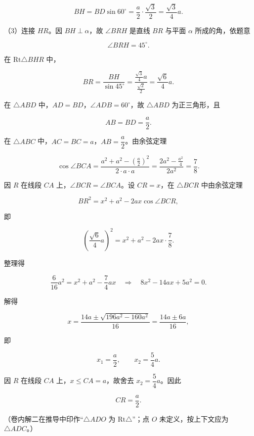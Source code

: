 \begin{answer}
\nopagebreak[4]
\[
BH=BD\sin60^\circ=\frac a2\cdot\frac{\sqrt3}{2}
=\frac{\sqrt3}{4}a.
\]

（3）连接 $HR$。因 $BH\perp\alpha$，故 $\angle BRH$ 是直线 $BR$ 与平面 $\alpha$ 所成的角，依题意

\nopagebreak[4]
\[
\angle BRH=45^\circ.
\]

在 $\mathrm{Rt}\triangle BHR$ 中，

\nopagebreak[4]
\[
BR=\frac{BH}{\sin45^\circ}
=\frac{\frac{\sqrt3}{4}a}{\frac{\sqrt2}{2}}
=\frac{\sqrt6}{4}a.
\]

在 $\triangle ABD$ 中，$AD=BD$，$\angle ADB=60^\circ$，故 $\triangle ABD$ 为正三角形，且

\nopagebreak[4]
\[
AB=BD=\frac a2.
\]

在 $\triangle ABC$ 中，$AC=BC=a$，$AB=\dfrac a2$。由余弦定理

\nopagebreak[4]
\[
\cos\angle BCA
=\frac{a^2+a^2-\left(\frac a2\right)^2}{2\cdot a\cdot a}
=\frac{2a^2-\frac{a^2}{4}}{2a^2}
=\frac78.
\]

因 $R$ 在线段 $CA$ 上，$\angle BCR=\angle BCA$。设 $CR=x$，在 $\triangle BCR$ 中由余弦定理

\nopagebreak[4]
\[
BR^2=x^2+a^2-2ax\cos\angle BCR,
\]

即

\nopagebreak[4]
\[
\left(\frac{\sqrt6}{4}a\right)^2
=x^2+a^2-2ax\cdot\frac78.
\]

整理得

\nopagebreak[4]
\[
\frac{6}{16}a^2=x^2+a^2-\frac74ax
\quad\Longrightarrow\quad
8x^2-14ax+5a^2=0.
\]

解得

\nopagebreak[4]
\[
x=\frac{14a\pm\sqrt{196a^2-160a^2}}{16}
=\frac{14a\pm6a}{16},
\]

即

\nopagebreak[4]
\[
x_1=\frac a2,\qquad x_2=\frac54a.
\]

因 $R$ 在线段 $CA$ 上，$x\le CA=a$，故舍去 $x_2=\dfrac54a$。因此

\nopagebreak[4]
\[
CR=\frac a2.
\]

（卷内解二在推导中印作“$\triangle ADO$ 为 $\mathrm{Rt}\triangle$”；点 $O$ 未定义，按上下文应为 $\triangle ADC$。）


\end{answer}
